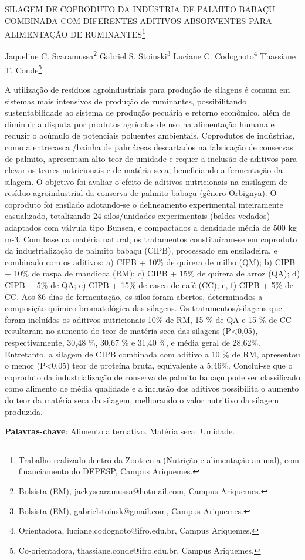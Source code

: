 \documentclass[article,12pt,onesidea,4paper,english,brazil]{abntex2}
\begin{document}
	
	
	\frenchspacing 
	
	\begin{center}
		\LARGE SILAGEM DE COPRODUTO DA INDÚSTRIA DE PALMITO BABAÇU COMBINADA COM DIFERENTES ADITIVOS ABSORVENTES
		PARA ALIMENTAÇÃO DE RUMINANTES\footnote{Trabalho realizado dentro da Zootecnia (Nutrição e alimentação animal), com financiamento do DEPESP, Campus Ariquemes.}
		
		\normalsize
		Jaqueline C. Scaramussa\footnote{Bolsista (EM), jackyscaramussa@hotmail.com, Campus Ariquemes.} 
		Gabriel S. Stoinski\footnote{Bolsista (EM), gabrielstoinsk@gmail.com, Campus Ariquemes.} 
		Luciane C. Codognoto\footnote{Orientadora, luciane.codognoto@ifro.edu.br, Campus Ariquemes.} 
		Thassiane T. Conde\footnote{Co-orientadora, thassiane.conde@ifro.edu.br, Campus Ariquemes.} 
	\end{center}
	
	\noindent A utilização de resíduos agroindustriais para produção de silagens é comum em sistemas mais intensivos de produção de ruminantes, possibilitando sustentabilidade ao sistema de produção pecuária e retorno econômico, além de diminuir a disputa por produtos agrícolas de uso na alimentação humana e reduzir o acúmulo de potenciais poluentes ambientais. Coprodutos de indústrias, como a entrecasca
	/bainha de palmáceas descartados na fabricação de conservas de palmito, apresentam alto teor de umidade e requer a inclusão de aditivos para elevar os teores nutricionais e de matéria seca, beneficiando a fermentação da silagem. O objetivo foi avaliar o efeito de aditivos nutricionais na ensilagem de resíduo agroindustrial da conserva de palmito babaçu (gênero Orbignya). O coproduto foi ensilado adotando-se o delineamento experimental inteiramente casualizado, totalizando 24 silos/unidades experimentais (baldes vedados) adaptados com válvula tipo Bunsen, e compactados a densidade média de 500 kg m-3. Com base na matéria natural, os tratamentos constituíram-se em coproduto da industrialização de palmito babaçu (CIPB), processado em ensiladeira, e combinado com os aditivos: a) CIPB + 10\% de quirera de milho (QM); b) CIPB + 10\% de raspa de mandioca (RM);
	c) CIPB + 15\% de quirera de arroz (QA); d) CIPB + 5\% de QA; e) CIPB + 15\% de casca de café (CC); e, f) CIPB + 5\% de CC. Aos 86 dias de fermentação, os silos foram abertos, determinados a composição químico-bromatológica das silagens. Os tratamentos/silagens que foram incluídos os aditivos nutricionais 10\% de RM, 15 \% de QA e 15 \% de CC resultaram no aumento do teor de matéria seca das silagens (P<0,05), respectivamente, 30,48 \%, 30,67 \% e 31,40 \%, e média geral de 28,62\%. Entretanto, a silagem de CIPB combinada com aditivo a 10 \% de RM, apresentou o menor (P<0,05) teor de proteína bruta, equivalente a 5,46\%. Conclui-se que o coproduto da industrialização de conserva de palmito babaçu pode ser classificado como alimento de média qualidade e a inclusão dos aditivos possibilita o aumento do teor da matéria seca da silagem, melhorando o valor nutritivo da silagem produzida.
	
	\vspace{\onelineskip}
	
	\noindent
	\textbf{Palavras-chave}: Alimento alternativo. Matéria seca. Umidade.
	
\end{document}
